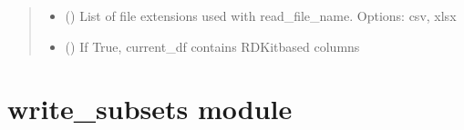 \documentclass[letterpaper,10pt,english]{sphinxmanual}
\begin{document}
\begin{fulllineitems}
\begin{quote}
\begin{description}
\begin{itemize}
\item {} 
\sphinxAtStartPar
{} (\sphinxstyleliteralemphasis{\sphinxupquote{{[}}}\sphinxstyleliteralemphasis{\sphinxupquote{{]}}}) \textendash{} List of file extensions used with read\_file\_name. Options: csv, xlsx

\item {} 
\sphinxAtStartPar
{} () \textendash{} If True, current\_df contains RDKit\sphinxhyphen{}based columns

\end{itemize}

\end{description}\end{quote}

\end{fulllineitems}


\sphinxstepscope


\section{write\_subsets module}
\label{\detokenize{write_subsets:module-write_subsets}}\label{\detokenize{write_subsets:write-subsets-module}}\label{\detokenize{write_subsets::doc}}
\end{document}
